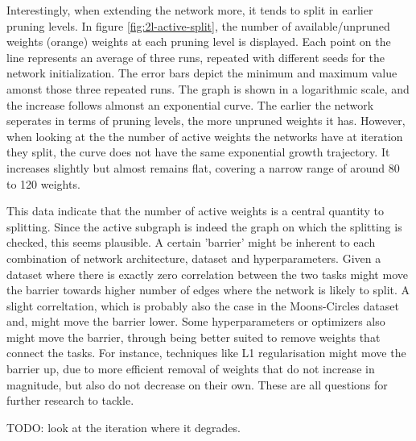 Interestingly, when extending the network more, it tends to split in earlier pruning levels.
In figure \ref{fig:2l-active-split}, the number of available/unpruned weights (orange) weights at each pruning level is displayed.
Each point on the line represents an average of three runs, repeated with different seeds for the network initialization.
The error bars depict the minimum and maximum value amonst those three repeated runs.
The graph is shown in a logarithmic scale, and the increase follows almonst an exponential curve.
The earlier the network seperates in terms of pruning levels, the more unpruned weights it has.
However, when looking at the the number of active weights the networks have at iteration they split, the curve does not have the same exponential growth trajectory.
It increases slightly but almost remains flat, covering a narrow range of around 80 to 120 weights.

This data indicate that the number of active weights is a central quantity to splitting.
Since the active subgraph is indeed the graph on which the splitting is checked, this seems plausible.
A certain 'barrier' might be inherent to each combination of network architecture, dataset and hyperparameters.
Given a dataset where there is exactly zero correlation between the two tasks might move the barrier towards higher number of edges where the network is likely to split.
A slight correltation, which is probably also the case in the Moons-Circles dataset and, might move the barrier lower.
Some hyperparameters or optimizers also might move the barrier, through being better suited to remove weights that connect the tasks.
For instance, techniques like L1 regularisation might move the barrier up, due to more efficient removal of weights that do not increase in magnitude, but also do not decrease on their own.
These are all questions for further research to tackle.
 
TODO: look at the iteration where it degrades.



